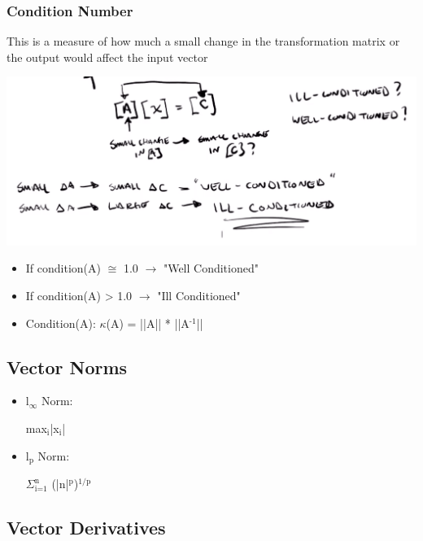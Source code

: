 \documentclass[11pt]{article}
\begin{document}
\subsubsection{Condition Number}
\label{sec:org3240eeb}

This is a measure of how much a small change in the transformation matrix or the output would affect the input vector

\begin{center}
\includegraphics[width=.9\linewidth]{./images/condition1.png}
\end{center}
\begin{itemize}
\item If condition(A) \(\cong\) 1.0 \(\rightarrow\) "Well Conditioned"
\item If condition(A) > 1.0 \(\rightarrow\) "Ill Conditioned"
\item Condition(A): \(\kappa\)(A) = ||A|| * ||A\(^{\text{-1}}\)||
\end{itemize}

\subsection{Vector Norms}
\label{sec:orgda1f068}

\begin{itemize}
\item l\(_{\infty}\) Norm:

max\(_{\text{i}}\)|x\(_{\text{i}}\)|

\item l\(_{\text{p}}\) Norm:

\(\Sigma_{\text{i=1}}^{\text{n}}\) (|n|\(^{\text{p}}\))\(^{\text{1/p}}\)
\end{itemize}

\subsection{Vector Derivatives}
\label{sec:org2df3647}
\end{document}
